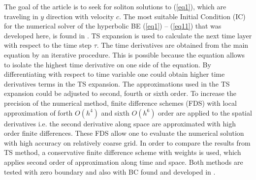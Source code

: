 \documentclass[leqno,11pt]{book}
\newcommand{\rf}[1]{(\ref{#1})}
\begin{document}
The goal of the article is to seek for soliton solutions to (\ref{eq1}), which 
are traveling  in $y$ direction with velocity $c$. The most suitable Initial Condition (IC) for the numerical solver of the hyperbolic BE \rf{eq1} -- \rf{eq11} that was developed here, is found in \cite{EllipticProblem}. TS expansion is used to calculate the next time layer with respect to the time step $\tau$. The time derivatives
are obtained from the main equation by an iterative procedure. This is possible because the equation allows to isolate the highest time derivative on one side of the equation. By differentiating with respect to time variable one could obtain higher time derivatives terms in the TS expansion. The approximations used in the TS expansion could be adjusted to second, fourth or sixth order. To increase the precision of the numerical method, finite difference schemes (FDS) with local approximation of forth $O(h^4)$ and sixth $O(h^6)$ order are applied to the spatial derivatives i.e. the second derivative along space are approximated with high order finite differences. These FDS allow one to evaluate the numerical solution with high accuracy on relatively coarse grid.
In order to compare the results from TS method, a conservative finite difference scheme with weights is used, which applies second order of approximation along
time and space.
Both methods are tested with zero boundary and also with BC found and developed in \cite{BoundaryProblem}.
\end{document}
